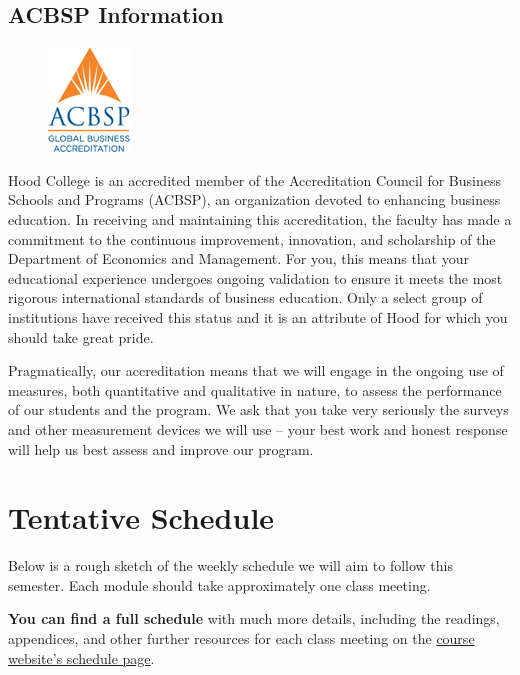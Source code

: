 \documentclass{article}
\begin{document}
\hypertarget{acbsp-information}{%
\subsection*{ACBSP Information}\label{acbsp-information}}

\begin{figure}[h!]
\centering
\includegraphics[]{../images/acbsp.png}
\end{figure}

Hood College is an accredited member of the Accreditation Council for
Business Schools and Programs (ACBSP), an organization devoted to
enhancing business education. In receiving and maintaining this
accreditation, the faculty has made a commitment to the continuous
improvement, innovation, and scholarship of the Department of Economics
and Management. For you, this means that your educational experience
undergoes ongoing validation to ensure it meets the most rigorous
international standards of business education. Only a select group of
institutions have received this status and it is an attribute of Hood
for which you should take great pride.

Pragmatically, our accreditation means that we will engage in the
ongoing use of measures, both quantitative and qualitative in nature, to
assess the performance of our students and the program. We ask that you
take very seriously the surveys and other measurement devices we will
use -- your best work and honest response will help us best assess and
improve our program.

\hypertarget{tentative-schedule}{%
\section*{Tentative Schedule}\label{tentative-schedule}}

Below is a rough sketch of the weekly schedule we will aim to follow
this semester. Each module should take approximately one class meeting.

\textbf{You can find a full schedule} with much more details, including
the readings, appendices, and other further resources for each class
meeting on the
\href{http://microF20.classes.ryansafner.com/schedule/}{course website's
schedule page}.
\end{document}
